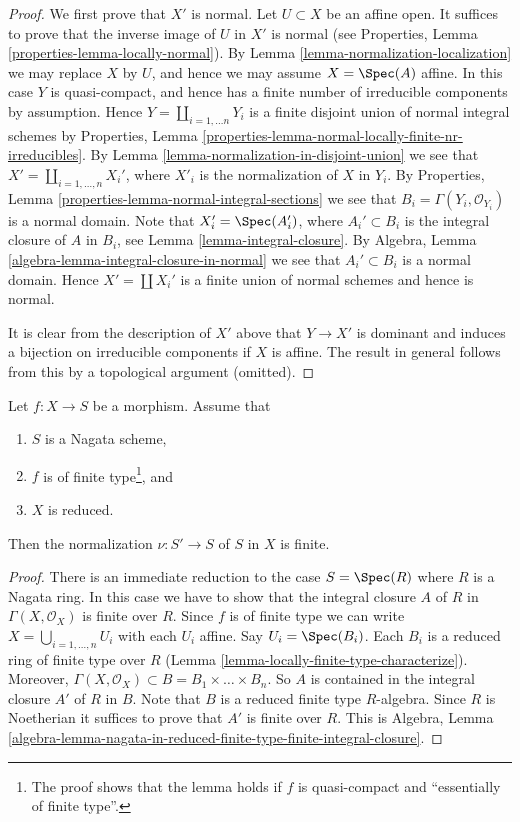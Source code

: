 \begin{proof}
We first prove that $X'$ is normal.
Let $U \subset X$ be an affine open. It suffices to prove that
the inverse image of $U$ in $X'$ is normal (see
Properties, Lemma \ref{properties-lemma-locally-normal}).
By Lemma \ref{lemma-normalization-localization} we may replace $X$ by $U$,
and hence we may assume $X = \Spec(A)$ affine.
In this case $Y$ is quasi-compact, and hence has a finite number of
irreducible components by assumption. Hence
$Y = \coprod_{i = 1, \ldots n} Y_i$ is a finite disjoint union of
normal integral schemes by
Properties, Lemma \ref{properties-lemma-normal-locally-finite-nr-irreducibles}.
By Lemma \ref{lemma-normalization-in-disjoint-union}
we see that $X' = \coprod_{i = 1, \ldots, n} X_i'$,
where $X'_i$ is the normalization of $X$ in $Y_i$.
By Properties, Lemma \ref{properties-lemma-normal-integral-sections}
we see that $B_i = \Gamma(Y_i, \mathcal{O}_{Y_i})$ is a normal domain.
Note that $X_i' = \Spec(A_i')$, where $A_i' \subset B_i$
is the integral closure of $A$ in $B_i$, see
Lemma \ref{lemma-integral-closure}. By
Algebra, Lemma \ref{algebra-lemma-integral-closure-in-normal}
we see that $A_i' \subset B_i$ is a normal domain.
Hence $X' = \coprod X_i'$ is a finite union of normal schemes
and hence is normal.

\medskip\noindent
It is clear from the description of $X'$ above that $Y \to X'$
is dominant and induces a bijection on irreducible components if
$X$ is affine. The result in general follows from this by a topological
argument (omitted).
\end{proof}

\begin{lemma}
\label{lemma-nagata-normalization-finite}
Let $f : X \to S$ be a morphism.
Assume that
\begin{enumerate}
\item $S$ is a Nagata scheme,
\item $f$ is of finite type\footnote{The proof
shows that the lemma holds if $f$ is quasi-compact and ``essentially
of finite type''.}, and
\item $X$ is reduced.
\end{enumerate}
Then the normalization $\nu : S' \to S$ of $S$ in $X$ is finite.
\end{lemma}

\begin{proof}
There is an immediate reduction to the case $S = \Spec(R)$
where $R$ is a Nagata ring. In this case we have to show that
the integral closure $A$ of $R$ in $\Gamma(X, \mathcal{O}_X)$ is
finite over $R$. Since $f$ is of finite type we can write
$X = \bigcup_{i = 1, \ldots, n} U_i$ with each $U_i$ affine.
Say $U_i = \Spec(B_i)$. Each $B_i$ is a reduced ring of finite type
over $R$ (Lemma \ref{lemma-locally-finite-type-characterize}).
Moreover, $\Gamma(X, \mathcal{O}_X) \subset B = B_1 \times \ldots \times B_n$.
So $A$ is contained in the integral closure $A'$ of $R$ in $B$.
Note that $B$ is a reduced finite type $R$-algebra. Since $R$ is Noetherian
it suffices to prove that $A'$ is finite over $R$. This is
Algebra, Lemma
\ref{algebra-lemma-nagata-in-reduced-finite-type-finite-integral-closure}.
\end{proof}

